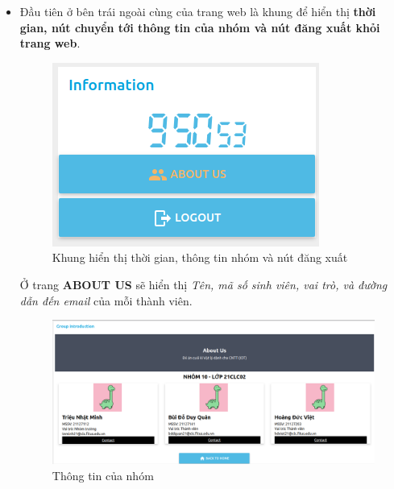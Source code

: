 \documentclass{report}
\begin{document}
\begin{itemize}
    \begin{itemize}
        \item Đầu tiên ở bên trái ngoài cùng của trang web là khung để hiển thị \textbf{thời gian, nút chuyển tới thông tin của nhóm và nút đăng xuất khỏi trang web}.
        \begin{figure}[H]
            \includegraphics[width=\textwidth, keepaspectratio]{img/information_group.png}
            \centering
            \caption{Khung hiển thị thời gian, thông tin nhóm và nút đăng xuất}
        \end{figure}
        Ở trang \textbf{ABOUT US} sẽ hiển thị \textit{Tên, mã số sinh viên, vai trò, và đường dẫn đến email} của mỗi thành viên.
        \begin{figure}[H]
            \includegraphics[width=\textwidth, keepaspectratio]{img/about_us.png}
            \centering
            \caption{Thông tin của nhóm}
        \end{figure}


\end{itemize}
\end{itemize}
\end{document}
